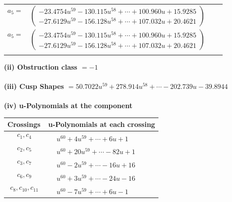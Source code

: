 \documentclass[1p]{elsarticle_modified}
\theoremstyle{definition}
\begin{document}
\begin{tabular}{m{7pt} m{180pt} m{7pt} m{180pt} }
\flushright $a_{5}=$&$\begin{pmatrix}-23.4754 u^{59}-130.115 u^{58}+\cdots+100.960 u+15.9285\\-27.6129 u^{59}-156.128 u^{58}+\cdots+107.032 u+20.4621\end{pmatrix}$\\ \flushright $a_{5}=$&$\begin{pmatrix}-23.4754 u^{59}-130.115 u^{58}+\cdots+100.960 u+15.9285\\-27.6129 u^{59}-156.128 u^{58}+\cdots+107.032 u+20.4621\end{pmatrix}$\\&\end{tabular}
\flushleft \textbf{(ii) Obstruction class $= -1$}\\~\\
\flushleft \textbf{(iii) Cusp Shapes $= 50.7022 u^{59}+278.914 u^{58}+\cdots-202.739 u-39.8944$}\\~\\
\newpage\renewcommand{\arraystretch}{1}
\flushleft \textbf{(iv) u-Polynomials at the component}\newline \\
\begin{tabular}{m{50pt}|m{274pt}}
Crossings & \hspace{64pt}u-Polynomials at each crossing \\
\hline $$\begin{aligned}c_{1},c_{4}\end{aligned}$$&$\begin{aligned}
&u^{60}+4 u^{59}+\cdots+6 u+1
\end{aligned}$\\
\hline $$\begin{aligned}c_{2},c_{5}\end{aligned}$$&$\begin{aligned}
&u^{60}+20 u^{59}+\cdots-82 u+1
\end{aligned}$\\
\hline $$\begin{aligned}c_{3},c_{7}\end{aligned}$$&$\begin{aligned}
&u^{60}-2 u^{59}+\cdots-16 u+16
\end{aligned}$\\
\hline $$\begin{aligned}c_{6},c_{9}\end{aligned}$$&$\begin{aligned}
&u^{60}+3 u^{59}+\cdots-24 u-16
\end{aligned}$\\
\hline $$\begin{aligned}c_{8},c_{10},c_{11}\end{aligned}$$&$\begin{aligned}
&u^{60}-7 u^{59}+\cdots+6 u-1
\end{aligned}$\\
\hline
\end{tabular}\\~\\
\end{document}
